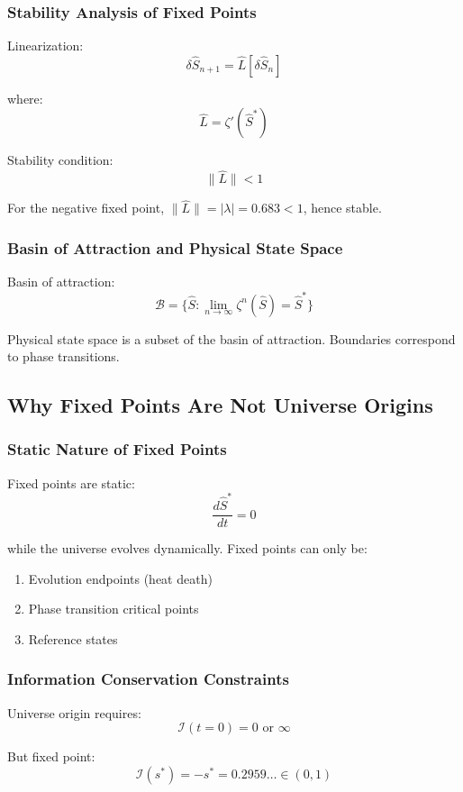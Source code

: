 \documentclass[11pt]{article}
\theoremstyle{plain}
\theoremstyle{definition}
\theoremstyle{remark}
\begin{document}
\subsubsection{Stability Analysis of Fixed Points}

Linearization:
$$\delta\hat{S}_{n+1} = \hat{L}[\delta\hat{S}_n]$$

where:
$$\hat{L} = \zeta'(\hat{S}^*)$$

Stability condition:
$$\|\hat{L}\| < 1$$

For the negative fixed point, $\|\hat{L}\| = |\lambda| = 0.683 < 1$, hence stable.

\subsubsection{Basin of Attraction and Physical State Space}

Basin of attraction:
$$\mathcal{B} = \{\hat{S}: \lim_{n\to\infty} \zeta^n(\hat{S}) = \hat{S}^*\}$$

Physical state space is a subset of the basin of attraction. Boundaries correspond to phase transitions.

\subsection{Why Fixed Points Are Not Universe Origins}

\subsubsection{Static Nature of Fixed Points}

Fixed points are static:
$$\frac{d\hat{S}^*}{dt} = 0$$

while the universe evolves dynamically. Fixed points can only be:
\begin{enumerate}
\item Evolution endpoints (heat death)
\item Phase transition critical points
\item Reference states
\end{enumerate}

\subsubsection{Information Conservation Constraints}

Universe origin requires:
$$\mathcal{I}(t=0) = 0 \text{ or } \infty$$

But fixed point:
$$\mathcal{I}(s^*) = -s^* = 0.2959\ldots \in (0, 1)$$
\end{document}
